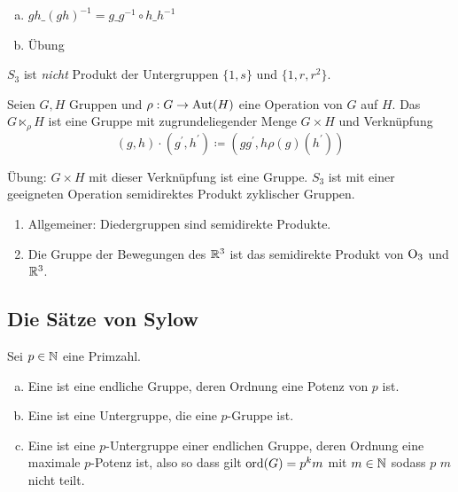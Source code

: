 \begin{beweis}
  \begin{enumerate}[(a)]
  \item[(c)] \(gh\_(gh)^{-1}=g\_g^{-1} \circ h\_h^{-1}\)
  \item[(e)] Übung
  \end{enumerate}
\end{beweis}

\begin{beispiel}
  \(S_3\) ist \emph{nicht} Produkt der Untergruppen \(\{1,s\}\) und \(\{1,r,r^2\}\).
\end{beispiel}

\begin{definition}
  Seien \(G,H\) Gruppen und \(\rho:G\to \mathrm{Aut}(H)\) eine Operation von \(G\) auf \(H\).
  Das  \(G\ltimes_\rho H\)
  ist eine Gruppe mit zugrundeliegender Menge \(G\times H\) und Verknüpfung
  \[
    (g,h)\cdot (g^\prime,h^\prime)\coloneq (gg^\prime, h\rho(g)(h^\prime))
  \]
\end{definition}

Übung: \(G\times H\) mit dieser Verknüpfung ist eine Gruppe. \(S_3\) ist mit einer geeigneten Operation semidirektes Produkt zyklischer Gruppen.

\begin{beispiel}
  \begin{enumerate}
  \item Allgemeiner: Diedergruppen sind semidirekte Produkte.
  \item Die Gruppe der Bewegungen des \(\mathbb{R}^3\) ist das semidirekte Produkt von \(\mathrm{O}_3\) und \(\mathbb{R}^3\).
  \end{enumerate}
\end{beispiel}

\subsection{Die Sätze von Sylow}

\begin{definition}
  Sei \(p\in\mathbb{N}\) eine Primzahl.
  \begin{enumerate}[(a)]
  \item Eine  ist eine endliche Gruppe, deren Ordnung eine Potenz von \(p\) ist.
  \item Eine  ist eine Untergruppe, die eine \(p\)-Gruppe ist.
  \item Eine  ist eine \(p\)-Untergruppe einer endlichen Gruppe, deren Ordnung eine maximale \(p\)-Potenz ist, also so dass gilt \(\mathrm{ord}(G)=p^km\) mit \(m\in \mathbb{N}\) sodass \(p\) \(m\) nicht teilt.
  \end{enumerate}
\end{definition}

